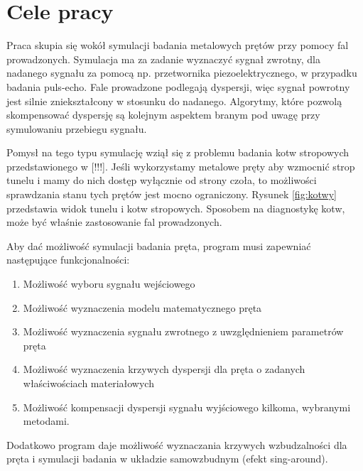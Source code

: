 \section{Cele pracy}
\label{sec:cel}

Praca skupia się wokół symulacji badania metalowych prętów przy pomocy fal prowadzonych. Symulacja ma za zadanie wyznaczyć sygnał zwrotny, dla nadanego sygnału za pomocą np. przetwornika piezoelektrycznego, w przypadku badania puls-echo. Fale prowadzone podlegają dyspersji, więc sygnał powrotny jest silnie zniekształcony w stosunku do nadanego. Algorytmy, które pozwolą skompensować dyspersję są kolejnym aspektem branym pod uwagę przy symulowaniu przebiegu sygnału.

Pomysł na tego typu symulację wziął się z problemu badania kotw stropowych przedstawionego w [!!!]. Jeśli wykorzystamy metalowe pręty aby wzmocnić strop tunelu i mamy do nich dostęp wyłącznie od strony czoła, to możliwości sprawdzania stanu tych prętów jest mocno ograniczony. Rysunek \ref{fig:kotwy} przedstawia widok tunelu i kotw stropowych. Sposobem na diagnostykę kotw, może być właśnie zastosowanie fal prowadzonych. 

Aby dać możliwość symulacji badania pręta, program musi zapewniać następujące funkcjonalności:
\begin{enumerate}
  \item Możliwość wyboru sygnału wejściowego
  \item Możliwość wyznaczenia modelu matematycznego pręta
  \item Możliwość wyznaczenia sygnału zwrotnego z uwzględnieniem parametrów pręta
  \item Możliwość wyznaczenia krzywych dyspersji dla pręta o zadanych właściwościach materiałowych
  \item Możliwość kompensacji dyspersji sygnału wyjściowego kilkoma, wybranymi metodami.
\end{enumerate}

\vspace{5mm}

Dodatkowo program daje możliwość wyznaczania krzywych wzbudzalności dla pręta i symulacji badania w układzie samowzbudnym (efekt sing-around).



















